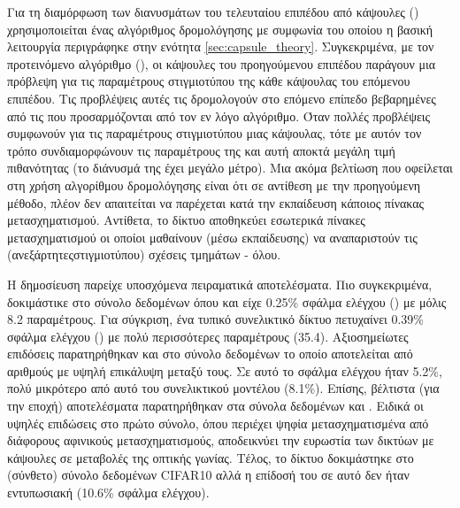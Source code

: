Για τη διαμόρφωση των διανυσμάτων του τελευταίου επιπέδου από κάψουλες () χρησιμοποιείται ένας αλγόριθμος δρομολόγησης με συμφωνία του οποίου η βασική λειτουργία περιγράφηκε στην ενότητα \ref{sec:capsule_theory}. Συγκεκριμένα, με τον προτεινόμενο αλγόριθμο  (), οι κάψουλες του προηγούμενου επιπέδου παράγουν μια πρόβλεψη για τις παραμέτρους στιγμιοτύπου της κάθε κάψουλας του επόμενου επιπέδου. Τις προβλέψεις αυτές τις δρομολογούν στο επόμενο επίπεδο βεβαρημένες από τις  που προσαρμόζονται από τον εν λόγο αλγόριθμο. Όταν πολλές προβλέψεις συμφωνούν για τις παραμέτρους στιγμιοτύπου μιας κάψουλας, τότε με αυτόν τον τρόπο συνδιαμορφώνουν τις παραμέτρους της και αυτή αποκτά μεγάλη τιμή πιθανότητας (το διάνυσμά της έχει μεγάλο μέτρο). Μια ακόμα βελτίωση που οφείλεται στη χρήση αλγορίθμου δρομολόγησης είναι ότι σε αντίθεση με την προηγούμενη μέθοδο, πλέον δεν απαιτείται να παρέχεται κατά την εκπαίδευση κάποιος πίνακας μετασχηματισμού. Αντίθετα, το δίκτυο αποθηκεύει εσωτερικά πίνακες μετασχηματισμού οι οποίοι μαθαίνουν (μέσω εκπαίδευσης) να αναπαριστούν τις (ανεξάρτητες\textendash στιγμιοτύπου) σχέσεις τμημάτων - όλου.\par

Η δημοσίευση  παρείχε υποσχόμενα πειραματικά αποτελέσματα. Πιο συγκεκριμένα, δοκιμάστικε στο σύνολο δεδομένων \cite{lecun1998gradientMNIST} όπου και είχε 0.25\% σφάλμα ελέγχου () με μόλις 8.2 παραμέτρους. Για σύγκριση, ένα τυπικό  συνελικτικό δίκτυο πετυχαίνει 0.39\% σφάλμα ελέγχου () με πολύ περισσότερες παραμέτρους (35.4). Αξιοσημείωτες επιδόσεις παρατηρήθηκαν και στο \cite{sabour2017dynamic} σύνολο δεδομένων το οποίο αποτελείται από αριθμούς με υψηλή επικάλυψη μεταξύ τους. Σε αυτό το σφάλμα ελέγχου ήταν 5.2\%, πολύ μικρότερο από αυτό του συνελικτικού μοντέλου (8.1\%). Επίσης, βέλτιστα (για την εποχή) αποτελέσματα παρατηρήθηκαν στα σύνολα δεδομένων  και . Ειδικά οι υψηλές επιδώσεις στο πρώτο σύνολο, όπου περιέχει ψηφία μετασχηματισμένα από διάφορους αφινικούς μετασχηματισμούς, αποδεικνύει την ευρωστία των δικτύων με κάψουλες σε μεταβολές της οπτικής γωνίας. Τέλος, το δίκτυο δοκιμάστηκε στο (σύνθετο) σύνολο δεδομένων CIFAR10 αλλά η επίδοσή του σε αυτό δεν ήταν εντυπωσιακή (10.6\% σφάλμα ελέγχου).

\subsubsection{}

